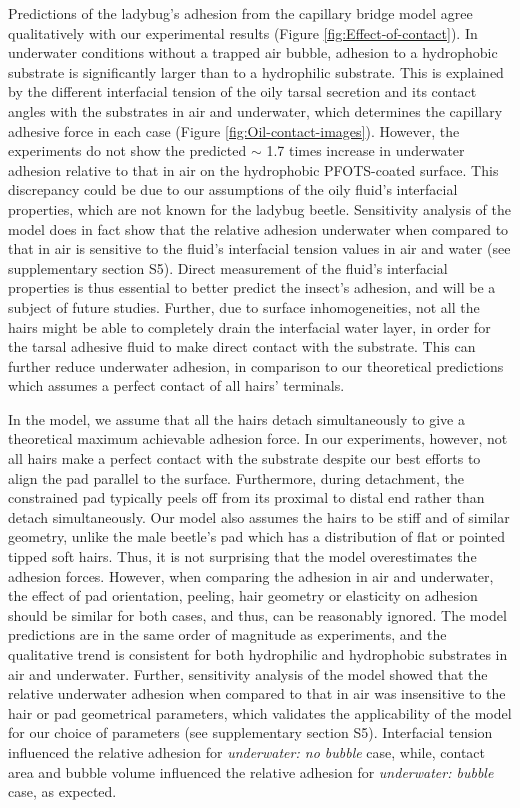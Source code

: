 \documentclass[vruler,JEB]{COB}%
\begin{document}
Predictions of the ladybug's adhesion from the capillary bridge model
agree qualitatively with our experimental results (Figure \ref{fig:Effect-of-contact}).
In underwater conditions without a trapped air bubble, adhesion to a hydrophobic
substrate is significantly larger than to a hydrophilic substrate.
This is explained by the different interfacial tension of the oily tarsal secretion and its contact
angles with the substrates in air and underwater, which determines
the capillary adhesive force in each case (Figure \ref{fig:Oil-contact-images}).
However, the experiments do not show the predicted $\sim$ 1.7 times
increase in underwater adhesion relative to that in air on the hydrophobic
PFOTS-coated surface. This discrepancy could be due to our assumptions of
the oily fluid's interfacial properties, which are not known for the ladybug beetle. Sensitivity analysis of the model does in fact show that the relative adhesion underwater when compared to that in air is sensitive to the fluid's interfacial tension values in air and water (see supplementary section S5).  Direct measurement of the fluid's interfacial
properties is thus essential to better predict the insect's adhesion,
and will be a subject of future studies. Further, due to surface inhomogeneities,
not all the hairs might be able to completely drain the interfacial
water layer, in order for the tarsal adhesive fluid to make direct contact
with the substrate. This can further reduce underwater adhesion, in
comparison to our theoretical predictions which assumes a perfect
contact of all hairs' terminals.

In the model, we assume that all the hairs detach simultaneously to
give a theoretical maximum achievable adhesion force. In our experiments,
however, not all hairs make a perfect contact with the substrate despite our 
best efforts to align the pad parallel to the surface. Furthermore, during detachment, 
the constrained pad typically peels off from its proximal to distal end rather
than detach simultaneously. Our model also assumes the hairs to be stiff and 
of similar geometry, unlike the male beetle's pad which has a distribution
of flat or pointed tipped soft hairs. Thus, it is not surprising that the
model overestimates the adhesion forces. However, when comparing the adhesion in air and underwater,
the effect of pad orientation, peeling, hair geometry or elasticity on adhesion should be similar for both cases, and thus, can be reasonably ignored. The model predictions are
in the same order of magnitude as experiments, and the qualitative
trend is consistent for both hydrophilic and hydrophobic substrates
in air and underwater. Further, sensitivity analysis of the model showed that 
the relative underwater adhesion when compared to that in air was insensitive to the hair or pad geometrical parameters, which validates the applicability of the model for our choice of parameters (see supplementary section S5). Interfacial tension influenced the relative adhesion for \emph{underwater: no bubble} case, while, contact area and bubble volume influenced the relative adhesion for \emph{underwater: bubble} case, as expected.
\end{document}
